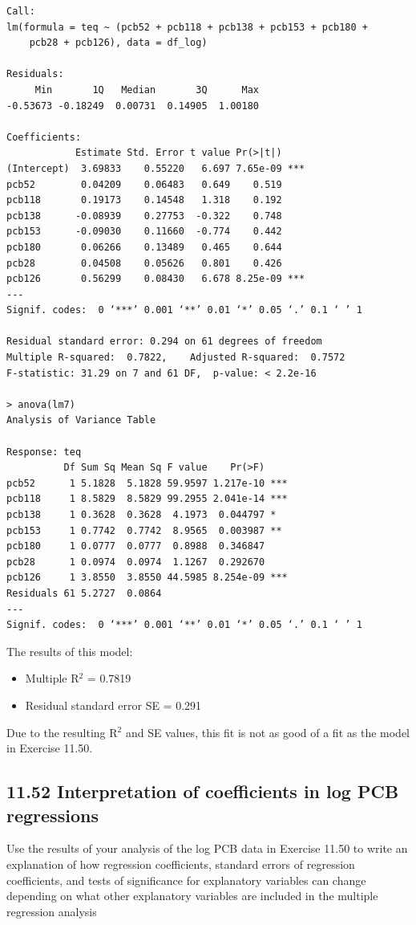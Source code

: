 \documentclass[11pt]{article}
\begin{document}
\begin{verbatim}
Call:
lm(formula = teq ~ (pcb52 + pcb118 + pcb138 + pcb153 + pcb180 + 
    pcb28 + pcb126), data = df_log)

Residuals:
     Min       1Q   Median       3Q      Max 
-0.53673 -0.18249  0.00731  0.14905  1.00180 

Coefficients:
            Estimate Std. Error t value Pr(>|t|)    
(Intercept)  3.69833    0.55220   6.697 7.65e-09 ***
pcb52        0.04209    0.06483   0.649    0.519    
pcb118       0.19173    0.14548   1.318    0.192    
pcb138      -0.08939    0.27753  -0.322    0.748    
pcb153      -0.09030    0.11660  -0.774    0.442    
pcb180       0.06266    0.13489   0.465    0.644    
pcb28        0.04508    0.05626   0.801    0.426    
pcb126       0.56299    0.08430   6.678 8.25e-09 ***
---
Signif. codes:  0 ‘***’ 0.001 ‘**’ 0.01 ‘*’ 0.05 ‘.’ 0.1 ‘ ’ 1

Residual standard error: 0.294 on 61 degrees of freedom
Multiple R-squared:  0.7822,	Adjusted R-squared:  0.7572 
F-statistic: 31.29 on 7 and 61 DF,  p-value: < 2.2e-16

> anova(lm7)
Analysis of Variance Table

Response: teq
          Df Sum Sq Mean Sq F value    Pr(>F)    
pcb52      1 5.1828  5.1828 59.9597 1.217e-10 ***
pcb118     1 8.5829  8.5829 99.2955 2.041e-14 ***
pcb138     1 0.3628  0.3628  4.1973  0.044797 *  
pcb153     1 0.7742  0.7742  8.9565  0.003987 ** 
pcb180     1 0.0777  0.0777  0.8988  0.346847    
pcb28      1 0.0974  0.0974  1.1267  0.292670    
pcb126     1 3.8550  3.8550 44.5985 8.254e-09 ***
Residuals 61 5.2727  0.0864                      
---
Signif. codes:  0 ‘***’ 0.001 ‘**’ 0.01 ‘*’ 0.05 ‘.’ 0.1 ‘ ’ 1
\end{verbatim}
The results of this model: 
\begin{itemize}
\item Multiple R\(^{\text{2}}\) = 0.7819
\item Residual standard error SE = 0.291
\end{itemize}

Due to the resulting R\(^{\text{2}}\) and SE values, this fit is not as good of a fit as the model in Exercise 11.50.

\subsection*{11.52 Interpretation of coefficients in log PCB regressions}
\label{sec:orgb9a0363}
Use the results of your analysis of the log PCB data in Exercise 11.50 to write an explanation of how regression coefficients, standard errors of regression coefficients, and tests of significance for explanatory variables can change depending on what other explanatory variables are included in the multiple regression analysis 
\end{document}
